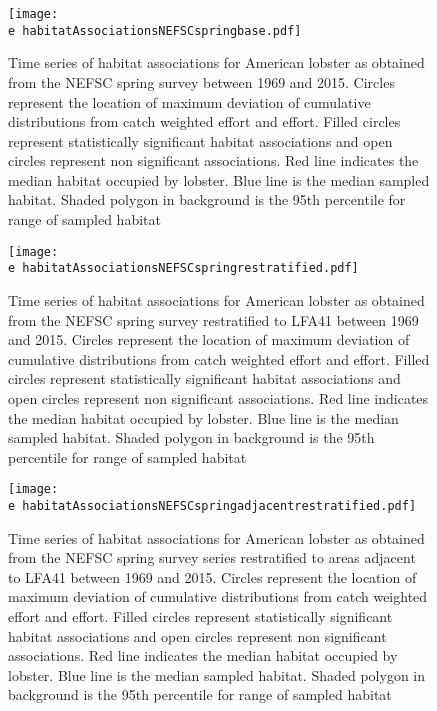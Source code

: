 \documentclass[11pt]{article}
\newcommand{\e}{/backup/bio_data/bio.lobster/figures/} %
\begin{document}


\begin{figure}

    \texttt{[image: \\e habitatAssociationsNEFSCspringbase.pdf]}
    \caption{Time series of habitat associations for American lobster as obtained from the NEFSC spring survey between 1969 and 2015. Circles represent the location of maximum deviation of cumulative distributions from catch weighted effort and effort. Filled circles represent statistically significant habitat associations and open circles represent non significant associations. Red line indicates
the median habitat occupied by lobster. Blue line is the median sampled habitat. Shaded polygon in background is the 95th percentile for range of sampled habitat}

\end{figure}



\begin{figure}

    \texttt{[image: \\e habitatAssociationsNEFSCspringrestratified.pdf]}
    \caption{Time series of habitat associations for American lobster as obtained from the NEFSC spring survey restratified to LFA41 between 1969 and 2015. Circles represent the location of maximum deviation of cumulative distributions from catch weighted effort and effort. Filled circles represent statistically significant habitat associations and open circles represent non significant associations. Red line indicates the median habitat occupied by lobster. Blue line is the median sampled habitat. Shaded polygon in background is the 95th percentile for range of sampled habitat}

\end{figure}



\begin{figure}

    \texttt{[image: \\e habitatAssociationsNEFSCspringadjacentrestratified.pdf]}
    \caption{Time series of habitat associations for American lobster as obtained from the NEFSC spring survey series restratified to areas adjacent to LFA41 between 1969 and 2015. Circles represent the location of maximum deviation of cumulative distributions from catch weighted effort and effort. Filled circles represent statistically significant habitat associations and open circles represent non significant associations. Red line indicates
the median habitat occupied by lobster. Blue line is the median sampled habitat. Shaded polygon in background is the 95th percentile for range of sampled habitat}

\end{figure}
\end{document}
